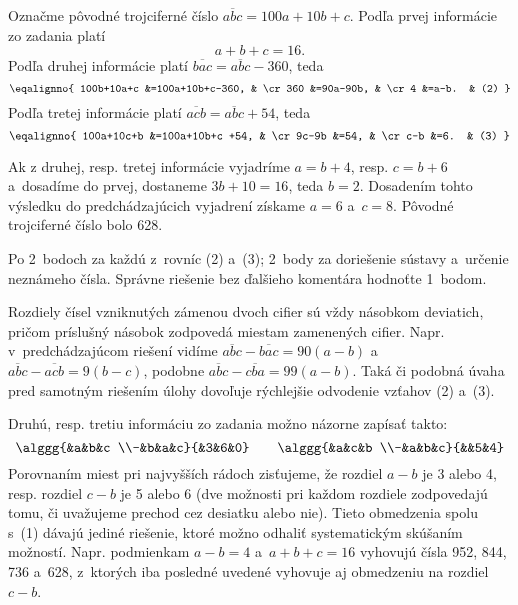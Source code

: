 {%
Označme pôvodné trojciferné číslo $\overline{abc}=100a+10b+c$.
Podľa prvej informácie zo zadania platí
$$
a+b+c=16. \tag{1}
$$
Podľa druhej informácie platí $\overline{bac}=\overline{abc}-360$, teda
$$\eqalignno{
100b+10a+c &=100a+10b+c-360, & \cr
360 &=90a-90b, & \cr
4 &=a-b. & (2) }
$$
Podľa tretej informácie platí $\overline{acb}=\overline{abc}+54$, teda
$$\eqalignno{
100a+10c+b &=100a+10b+c +54, & \cr
9c-9b &=54, & \cr
c-b &=6. & (3) }
$$

Ak z druhej, resp. tretej informácie vyjadríme $a=b+4$, resp. $c=b+6$ a~dosadíme do prvej, dostaneme $3b+10=16$, teda $b=2$.
Dosadením tohto výsledku do predchádzajúcich vyjadrení získame $a=6$ a~$c=8$.
Pôvodné trojciferné číslo bolo 628.

\hodnotenie
Po 2~bodoch za každú z~rovníc (2) a~(3);
2~body za doriešenie sústavy a~určenie neznámeho čísla.
Správne riešenie bez ďalšieho komentára hodnoťte 1~bodom.

\poznamky
Rozdiely čísel vzniknutých zámenou dvoch cifier sú vždy násobkom deviatich, pričom príslušný násobok zodpovedá miestam zamenených cifier.
Napr. v~predchádzajúcom riešení vidíme $\overline{abc}-\overline{bac}=90(a-b)$ a~$\overline{abc}-\overline{acb}=9(b-c)$, podobne $\overline{abc}-\overline{cba}=99(a-b)$.
Taká či podobná úvaha pred samotným riešením úlohy dovoľuje rýchlejšie odvodenie vzťahov (2) a~(3).

Druhú, resp. tretiu informáciu zo zadania možno názorne zapísať takto:
$$
\alggg{&a&b&c \\-&b&a&c}{&3&6&0} \qquad
\alggg{&a&c&b \\-&a&b&c}{&&5&4}
$$
Porovnaním miest pri najvyšších rádoch zisťujeme, že rozdiel $a-b$ je 3 alebo 4, resp. rozdiel $c-b$ je 5 alebo 6 (dve možnosti pri každom rozdiele zodpovedajú tomu, či uvažujeme prechod cez desiatku alebo nie).
Tieto obmedzenia spolu s~(1) dávajú jediné riešenie, ktoré možno odhaliť systematickým skúšaním možností.
Napr. podmienkam $a-b=4$ a~$a+b+c=16$ vyhovujú čísla 952, 844, 736 a~628, z~ktorých iba posledné uvedené vyhovuje aj obmedzeniu na rozdiel $c-b$.
\endhodnotenie
}

